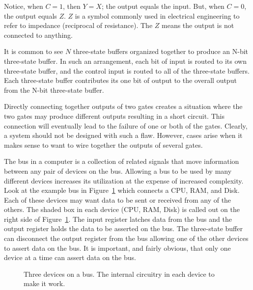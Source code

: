 Notice, when $C=1$, then $Y=X$; the output equals the
input.  But, when $C=0$, the output equals $Z$.  $Z$ is
a symbol commonly used in electrical engineering
to refer to impedance (reciprocal of resistance).  The
$Z$ means the output is not connected to anything.

It is common to see $N$ three-state buffers organized together to
produce an N-bit three-state buffer.  In such an arrangement, 
each bit of input is routed to its own three-state buffer,
and the control input is routed to all of the three-state 
buffers.  Each three-state buffer contributes its one bit 
of output to the overall output from the N-bit three-state
buffer.
 

Directly connecting together outputs of two gates creates
a situation where the two gates may produce different outputs
resulting in a short circuit.  This connection will
eventually lead to the failure of one or both of the gates.
Clearly, a system should not be designed with such a flaw.
However, cases arise when it makes sense to want to wire
together the outputs of several gates.

The bus  in a computer is a collection
of related signals that move information between any pair
of devices on the bus.  Allowing a bus to be used by many
different devices increases its utilization at the expense 
of increased complexity.  Look at the example bus in 
Figure~\ref{fig:bus} which connects a CPU, RAM, and Disk.
Each of these devices may want data to be sent or
received from any of the others.  The shaded box in each device 
(CPU, RAM, Disk) is called out on the right side of Figure~\ref{fig:bus}.
The input register latches data from the bus and the output
register holds the data to be asserted on the bus.  The 
three-state buffer can disconnect the output register from the bus 
allowing one of the other devices to assert data on the bus.  
It is important, and fairly obvious, that only one device at a 
time can assert data on the bus.  

\begin{figure}[ht]
\caption{Three devices on a bus.  The internal circuitry in
each device to make it work.}
\label{fig:bus}
\end{figure}

